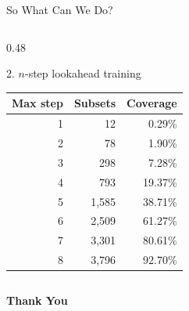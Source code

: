 \documentclass[
11pt,notheorems,hyperref={pdfauthor=whatever}
]{beamer}
\begin{document}
\begin{frame}{So What Can We Do?}
\begin{columns}[T,onlytextwidth]
\begin{column}{0.48\textwidth}
\begin{block}{2. \(n\)-step lookahead training}
\vspace{0.15em}
\centering
{\scriptsize
\begin{tabular}{r r r}
\toprule
Max step & Subsets & Coverage \\
\midrule
1 & 12 & 0.29\% \\
2 & 78 & 1.90\% \\
3 & 298 & 7.28\% \\
4 & 793 & 19.37\% \\
5 & 1,585 & 38.71\% \\
6 & 2,509 & 61.27\% \\
7 & 3,301 & 80.61\% \\
8 & 3,796 & 92.70\% \\
\bottomrule
\end{tabular}
}
\end{block}
\end{column}
\end{columns}
\end{frame}

\begin{frame}[plain]
\centering
\vfill
{\Huge\bfseries Thank You}
\vfill
\end{frame}
\end{document}

